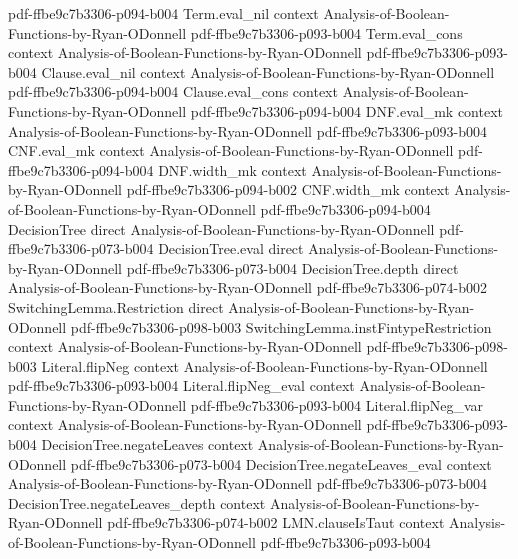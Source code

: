 \begin{theorem}
  {pdf-ffbe9c7b3306-p094-b004}
\proofstep
  {Term.eval_nil}
  {context}
  {Analysis-of-Boolean-Functions-by-Ryan-ODonnell}
  {pdf-ffbe9c7b3306-p093-b004}
\proofstep
  {Term.eval_cons}
  {context}
  {Analysis-of-Boolean-Functions-by-Ryan-ODonnell}
  {pdf-ffbe9c7b3306-p093-b004}
\proofstep
  {Clause.eval_nil}
  {context}
  {Analysis-of-Boolean-Functions-by-Ryan-ODonnell}
  {pdf-ffbe9c7b3306-p094-b004}
\proofstep
  {Clause.eval_cons}
  {context}
  {Analysis-of-Boolean-Functions-by-Ryan-ODonnell}
  {pdf-ffbe9c7b3306-p094-b004}
\proofstep
  {DNF.eval_mk}
  {context}
  {Analysis-of-Boolean-Functions-by-Ryan-ODonnell}
  {pdf-ffbe9c7b3306-p093-b004}
\proofstep
  {CNF.eval_mk}
  {context}
  {Analysis-of-Boolean-Functions-by-Ryan-ODonnell}
  {pdf-ffbe9c7b3306-p094-b004}
\proofstep
  {DNF.width_mk}
  {context}
  {Analysis-of-Boolean-Functions-by-Ryan-ODonnell}
  {pdf-ffbe9c7b3306-p094-b002}
\proofstep
  {CNF.width_mk}
  {context}
  {Analysis-of-Boolean-Functions-by-Ryan-ODonnell}
  {pdf-ffbe9c7b3306-p094-b004}
\proofstep
  {DecisionTree}
  {direct}
  {Analysis-of-Boolean-Functions-by-Ryan-ODonnell}
  {pdf-ffbe9c7b3306-p073-b004}
\proofstep
  {DecisionTree.eval}
  {direct}
  {Analysis-of-Boolean-Functions-by-Ryan-ODonnell}
  {pdf-ffbe9c7b3306-p073-b004}
\proofstep
  {DecisionTree.depth}
  {direct}
  {Analysis-of-Boolean-Functions-by-Ryan-ODonnell}
  {pdf-ffbe9c7b3306-p074-b002}
\proofstep
  {SwitchingLemma.Restriction}
  {direct}
  {Analysis-of-Boolean-Functions-by-Ryan-ODonnell}
  {pdf-ffbe9c7b3306-p098-b003}
\proofstep
  {SwitchingLemma.instFintypeRestriction}
  {context}
  {Analysis-of-Boolean-Functions-by-Ryan-ODonnell}
  {pdf-ffbe9c7b3306-p098-b003}
\proofstep
  {Literal.flipNeg}
  {context}
  {Analysis-of-Boolean-Functions-by-Ryan-ODonnell}
  {pdf-ffbe9c7b3306-p093-b004}
\proofstep
  {Literal.flipNeg_eval}
  {context}
  {Analysis-of-Boolean-Functions-by-Ryan-ODonnell}
  {pdf-ffbe9c7b3306-p093-b004}
\proofstep
  {Literal.flipNeg_var}
  {context}
  {Analysis-of-Boolean-Functions-by-Ryan-ODonnell}
  {pdf-ffbe9c7b3306-p093-b004}
\proofstep
  {DecisionTree.negateLeaves}
  {context}
  {Analysis-of-Boolean-Functions-by-Ryan-ODonnell}
  {pdf-ffbe9c7b3306-p073-b004}
\proofstep
  {DecisionTree.negateLeaves_eval}
  {context}
  {Analysis-of-Boolean-Functions-by-Ryan-ODonnell}
  {pdf-ffbe9c7b3306-p073-b004}
\proofstep
  {DecisionTree.negateLeaves_depth}
  {context}
  {Analysis-of-Boolean-Functions-by-Ryan-ODonnell}
  {pdf-ffbe9c7b3306-p074-b002}
\proofstep
  {LMN.clauseIsTaut}
  {context}
  {Analysis-of-Boolean-Functions-by-Ryan-ODonnell}
  {pdf-ffbe9c7b3306-p093-b004}
\proofstep

\end{theorem}
